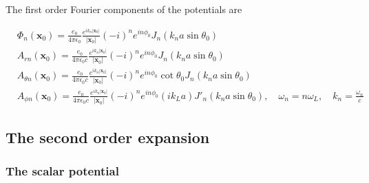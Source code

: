 The first order Fourier components of the potentials are
\begin{tcolorbox}[colback=blue!5!white,colframe=blue!75!black]
    \begin{align}
         & \Phi_n({\bm x}_0)=\frac{e_0}{4\pi\epsilon_0}\frac{e^{ik_n |{\bm x}_0|}}{|{\bm x}_0|}(-i)^ne^{in\phi_0}J_n(k_na\sin\theta_0)\nonumber                                                           \\
         & A_{rn}({\bm x}_0)= \frac{e_0}{4\pi\epsilon_0c}\frac{e^{ik_n |{\bm x}_0|}}{|{\bm x}_0|}(-i)^ne^{in\phi_0}J_n(k_na\sin\theta_0)                                                                  \\
         & A_{\theta n}({\bm x}_0)= \frac{e_0}{4\pi\epsilon_0c}\frac{e^{ik_n |{\bm x}_0|}}{|{\bm x}_0|}(-i)^ne^{in\phi_0}\cot\theta_0J_n(k_na\sin\theta_0)                                                \\
         & A_{\phi n}({\bm x}_0)=\frac{e_0}{4\pi\epsilon_0c}\frac{e^{ik_n |{\bm x}_0|}}{|{\bm x}_0|}(-i)^ne^{in\phi_0}(ik_La)J'_n(k_na\sin\theta_0), \quad \omega_n=n\omega_L, \quad k_n=\frac{\omega_n}c
    \end{align}
\end{tcolorbox}




\subsection{The second order expansion}


\subsubsection{The scalar potential}

